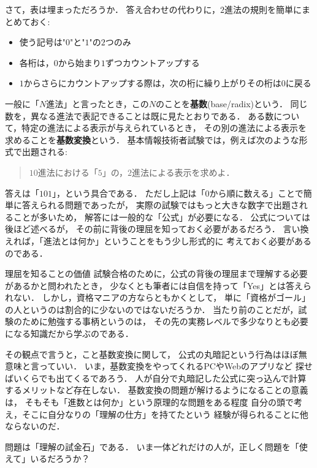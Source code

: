 \documentclass[a5j, uplatex, dvipdfmx]{jsbook}
\makeatletter
\newcommand{\ind}[2]{\textbf{#1}\index{#2@#1}}
\makeatother
\begin{document}
    さて，表は埋まっただろうか．
    答え合わせの代わりに，$2$進法の規則を簡単にまとめておく:

    \begin{itemize}
        \item 使う記号は"$0$"と"$1$"の$2$つのみ
        \item 各桁は，$0$から始まり$1$ずつカウントアップする
        \item $1$からさらにカウントアップする際は，次の桁に繰り上がりその桁は$0$に戻る
    \end{itemize}

    一般に「$N$進法」と言ったとき，この$N$のことを\ind{基数}{きすう}(base/radix)という．
    同じ数を，異なる進法で表記できることは既に見たとおりである．
    ある数について，特定の進法による表示が与えられているとき，
    その別の進法による表示を求めることを\ind{基数変換}{きすうへんかん}という．
    基本情報技術者試験では，例えば次のような形式で出題される:

    \begin{quote}
        $10$進法における「$5$」の，$2$進法による表示を求めよ．
    \end{quote}
    
    答えは「$101$」，という具合である．
    ただし上記は「$0$から順に数える」ことで簡単に答えられる問題であったが，
    実際の試験ではもっと大きな数字で出題されることが多いため，
    解答には一般的な「公式」が必要になる．
    公式については後ほど述べるが，
    その前に背後の理屈を知っておく必要があるだろう．
    言い換えれば，「進法とは何か」ということをもう少し形式的に
    考えておく必要があるのである．

    \begin{rem}{理屈を知ることの価値}{}
        試験合格のために，公式の背後の理屈まで理解する必要があるかと問われたとき，
        少なくとも筆者には自信を持って「Yes」とは答えられない．
        しかし，資格マニアの方ならともかくとして，
        単に「資格がゴール」の人というのは割合的に少ないのではないだろうか．
        当たり前のことだが，試験のために勉強する事柄というのは，
        その先の実務レベルで多少なりとも必要になる知識だから学ぶのである．

        その観点で言うと，こと基数変換に関して，
        公式の丸暗記という行為はほぼ無意味と言っていい．
        いま，基数変換をやってくれるPCやWebのアプリなど
        探せばいくらでも出てくるであろう．
        人が自分で丸暗記した公式に突っ込んで計算するメリットなど存在しない．
        基数変換の問題が解けるようになることの意義は，
        そもそも「進数とは何か」という原理的な問題をある程度
        自分の頭で考え，そこに自分なりの「理解の仕方」を持てたという
        経験が得られることに他ならないのだ．

        問題は「理解の試金石」である．
        いま一体どれだけの人が，正しく問題を「使えて」いるだろうか？
    \end{rem}
\end{document}
